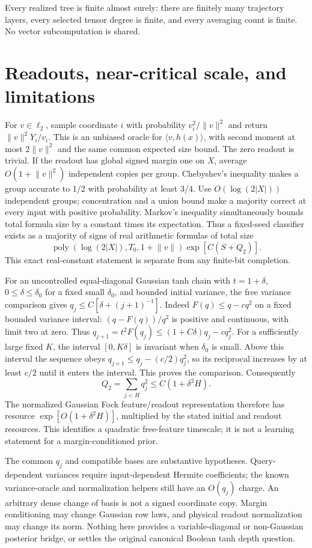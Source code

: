 \documentclass[11pt]{article}
\newcommand{\norm}[1]{\lVert #1\rVert}
\newcommand{\poly}{\operatorname{poly}}
\begin{document}
Every realized tree is finite almost surely: there are finitely many
trajectory layers, every selected tensor degree is finite, and every
averaging count is finite. No vector subcomputation is shared.

\section{Readouts, near-critical scale, and limitations}

For $v\in\ell_2$, sample coordinate $i$ with probability
$v_i^2/\norm v^2$ and return $\norm v^2Y_i/v_i$. This is an unbiased
oracle for $\langle v,h(x)\rangle$, with second moment at most
$2\norm v^2$ and the same common expected size bound. The zero readout is
trivial. If the readout has global signed margin one on $X$, average
$O(1+\norm v^2)$ independent copies per group. Chebyshev's inequality
makes a group accurate to $1/2$ with probability at least $3/4$.
Use $O(\log(2|X|))$ independent groups; concentration and a union bound
make a majority correct at every input with positive probability.
Markov's inequality simultaneously bounds total formula size by a
constant times its expectation. Thus a fixed-seed classifier exists as
a majority of signs of real arithmetic formulas of total size
\[
 \poly(\log(2|X|),T_0,1+\norm v)\exp[C(S+Q_2)].
\]
This exact real-constant statement is separate from any finite-bit
completion.

For an uncontrolled equal-diagonal Gaussian tanh chain with
$t=1+\delta$, $0\le\delta\le\delta_0$ for a fixed small $\delta_0$,
and bounded initial variance, the free variance comparison gives
$q_j\le C[\delta+(j+1)^{-1}]$. Indeed $F(q)\le q-cq^2$ on a fixed
bounded variance interval: $(q-F(q))/q^2$ is positive and continuous,
with limit two at zero. Thus
$q_{j+1}=t^2F(q_j)\le(1+C\delta)q_j-cq_j^2$.
For a sufficiently large fixed $K$, the interval $[0,K\delta]$ is
invariant when $\delta_0$ is small. Above this interval the sequence
obeys $q_{j+1}\le q_j-(c/2)q_j^2$, so its reciprocal increases by at
least $c/2$ until it enters the interval. This proves the comparison.
Consequently
\[
 Q_2=\sum_{j<H}q_j^2\le C(1+\delta^2H).
\]
The normalized Gaussian Fock feature/readout representation therefore
has resource $\exp[O(1+\delta^2H)]$, multiplied by the stated initial
and readout resources. This identifies a quadratic free-feature
timescale; it is not a learning statement for a margin-conditioned prior.

The common $q_j$ and compatible bases are substantive hypotheses.
Query-dependent variances require input-dependent Hermite coefficients;
the known variance-oracle and normalization helpers still have an
$O(q_j)$ charge. An arbitrary dense change of basis is not a signed
coordinate copy. Margin conditioning may change Gaussian row laws, and
physical readout normalization may change its norm. Nothing here
provides a variable-diagonal or non-Gaussian posterior bridge, or settles
the original canonical Boolean tanh depth question.
\end{document}

